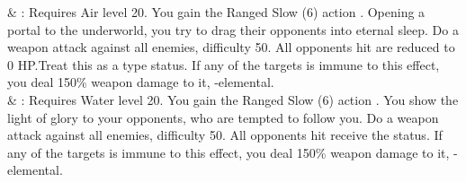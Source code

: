 \begin{tabjob}
     & %
    : Requires Air level 20. You gain the Ranged Slow (6) action . Opening a portal to the underworld, you try to drag their opponents into eternal sleep. Do a weapon attack against all enemies, difficulty 50. All opponents hit are reduced to 0 HP.\@{}Treat this as a  type status. If any of the targets is immune to this effect, you deal 150\% weapon damage to it, -elemental. \\
     & %
    : Requires Water level 20. You gain the Ranged Slow (6) action . You show the light of glory to your opponents, who are tempted to follow you. Do a weapon attack against all enemies, difficulty 50. All opponents hit receive the  status. If any of the targets is immune to this effect, you deal 150\% weapon damage to it, -elemental. \\
\end{tabjob}

\begin{center}
    \parbox{.75\textwidth}{
    }
    \end{center}